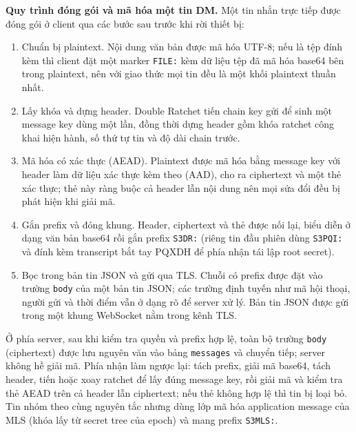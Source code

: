 \textbf{Quy trình đóng gói và mã hóa một tin DM.} Một tin nhắn trực tiếp được đóng gói ở client qua các bước sau trước khi rời thiết bị:
\begin{enumerate}
    \item Chuẩn bị plaintext. Nội dung văn bản được mã hóa UTF-8; nếu là tệp đính kèm thì client đặt một marker \texttt{FILE:} kèm dữ liệu tệp đã mã hóa base64 bên trong plaintext, nên với giao thức mọi tin đều là một khối plaintext thuần nhất.
    \item Lấy khóa và dựng header. Double Ratchet tiến chain key gửi để sinh một message key dùng một lần, đồng thời dựng header gồm khóa ratchet công khai hiện hành, số thứ tự tin và độ dài chain trước.
    \item Mã hóa có xác thực (AEAD). Plaintext được mã hóa bằng message key với header làm dữ liệu xác thực kèm theo (AAD), cho ra ciphertext và một thẻ xác thực; thẻ này ràng buộc cả header lẫn nội dung nên mọi sửa đổi đều bị phát hiện khi giải mã.
    \item Gắn prefix và đóng khung. Header, ciphertext và thẻ được nối lại, biểu diễn ở dạng văn bản base64 rồi gắn prefix \texttt{S3DR:} (riêng tin đầu phiên dùng \texttt{S3PQI:} và đính kèm transcript bắt tay PQXDH để phía nhận tái lập root secret).
    \item Bọc trong bản tin JSON và gửi qua TLS. Chuỗi có prefix được đặt vào trường \texttt{body} của một bản tin JSON; các trường định tuyến như mã hội thoại, người gửi và thời điểm vẫn ở dạng rõ để server xử lý. Bản tin JSON được gửi trong một khung WebSocket nằm trong kênh TLS.
\end{enumerate}
Ở phía server, sau khi kiểm tra quyền và prefix hợp lệ, toàn bộ trường \texttt{body} (ciphertext) được lưu nguyên văn vào bảng \texttt{messages} và chuyển tiếp; server không hề giải mã. Phía nhận làm ngược lại: tách prefix, giải mã base64, tách header, tiến hoặc xoay ratchet để lấy đúng message key, rồi giải mã và kiểm tra thẻ AEAD trên cả header lẫn ciphertext; nếu thẻ không hợp lệ thì tin bị loại bỏ. Tin nhóm theo cùng nguyên tắc nhưng dùng lớp mã hóa application message của MLS (khóa lấy từ secret tree của epoch) và mang prefix \texttt{S3MLS:}.

